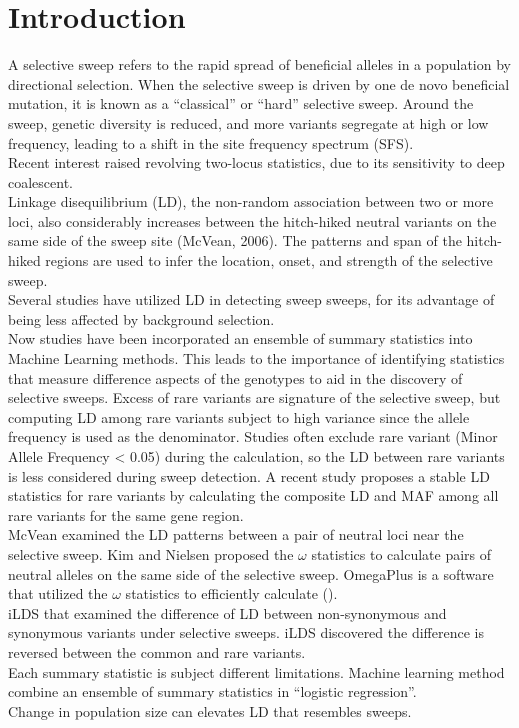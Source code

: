 \documentclass[12pt]{article}
\begin{document}
\section{Introduction}
A selective sweep refers to the rapid spread of beneficial alleles in a population by directional selection. When the selective sweep is driven by one de novo beneficial mutation, it is known as a “classical” or “hard” selective sweep. Around the sweep, genetic diversity is reduced, and more variants segregate at high or low frequency, leading to a shift in the site frequency spectrum (SFS). 
\\
Recent interest raised revolving two-locus statistics, due to its sensitivity to deep coalescent. 
\\
Linkage disequilibrium (LD), the non-random association between two or more loci, also considerably increases between the hitch-hiked neutral variants on the same side of the sweep site (McVean, 2006). The patterns and span of the hitch-hiked regions are used to infer the location, onset, and strength of the selective sweep. 
\\
Several studies have utilized LD in detecting sweep sweeps, for its advantage of being less affected by background selection.
\\
Now studies have been incorporated an ensemble of summary statistics into Machine Learning methods. This leads to the importance of identifying statistics that measure difference aspects of the genotypes to aid in the discovery of selective sweeps.
Excess of rare variants are signature of the selective sweep, but computing LD among rare variants subject to high variance since the allele frequency is used as the denominator. Studies often exclude rare variant (Minor Allele Frequency < 0.05) during the calculation, so the LD between rare variants is less considered during sweep detection. A recent study proposes a stable LD statistics for rare variants by calculating the composite LD and MAF among all rare variants for the same gene region. 
\\
McVean examined the LD patterns between a pair of neutral loci near the selective sweep. Kim and Nielsen proposed the $\omega$ statistics to calculate pairs of neutral alleles on the same side of the selective sweep. OmegaPlus is a software that utilized the $\omega$ statistics to efficiently calculate (). 
\\
iLDS that examined the difference of LD between non-synonymous and synonymous variants under selective sweeps. iLDS discovered the difference is reversed between the common and rare variants. 
\\
Each summary statistic is subject different limitations. Machine learning method combine an ensemble of summary statistics in “logistic regression”.
\\
Change in population size can elevates LD that resembles sweeps. 
\end{document}
